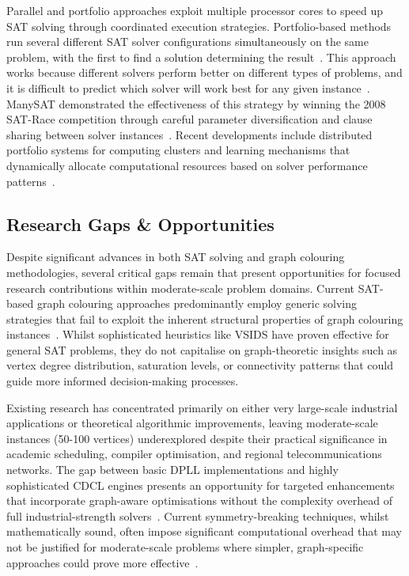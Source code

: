 Parallel and portfolio approaches exploit multiple processor cores to speed up SAT solving through coordinated execution strategies. Portfolio-based methods run several different SAT solver configurations simultaneously on the same problem, with the first to find a solution determining the result~\cite{hamadi2009manysat}. This approach works because different solvers perform better on different types of problems, and it is difficult to predict which solver will work best for any given instance~\cite{balyo2015hordesat}. ManySAT demonstrated the effectiveness of this strategy by winning the 2008 SAT-Race competition through careful parameter diversification and clause sharing between solver instances~\cite{hamadi2009manysat}. Recent developments include distributed portfolio systems for computing clusters and learning mechanisms that dynamically allocate computational resources based on solver performance patterns~\cite{guo2010diversification}.

\subsection{Research Gaps \& Opportunities}

Despite significant advances in both SAT solving and graph colouring methodologies, several critical gaps remain that present opportunities for focused research contributions within moderate-scale problem domains. Current SAT-based graph colouring approaches predominantly employ generic solving strategies that fail to exploit the inherent structural properties of graph colouring instances~\cite{hebrard2020constraint}. Whilst sophisticated heuristics like VSIDS have proven effective for general SAT problems, they do not capitalise on graph-theoretic insights such as vertex degree distribution, saturation levels, or connectivity patterns that could guide more informed decision-making processes.

Existing research has concentrated primarily on either very large-scale industrial applications or theoretical algorithmic improvements, leaving moderate-scale instances (50-100 vertices) underexplored despite their practical significance in academic scheduling, compiler optimisation, and regional telecommunications networks. The gap between basic DPLL implementations and highly sophisticated CDCL engines presents an opportunity for targeted enhancements that incorporate graph-aware optimisations without the complexity overhead of full industrial-strength solvers~\cite{moskewicz2001chaff,marques2009handbook}. Current symmetry-breaking techniques, whilst mathematically sound, often impose significant computational overhead that may not be justified for moderate-scale problems where simpler, graph-specific approaches could prove more effective~\cite{crawford1996symmetry}.

